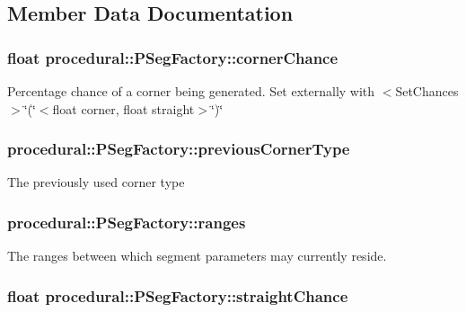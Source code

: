\subsection{Member Data Documentation}
\hypertarget{classprocedural_1_1_p_seg_factory_a02557cf9cc05ee759b23a95e45126dd4}{
\subsubsection[{corner\-Chance}]{\setlength{\rightskip}{0pt plus 5cm}float procedural\-::\-P\-Seg\-Factory\-::corner\-Chance\hspace{0.3cm}{\ttfamily [private]}}}\label{classprocedural_1_1_p_seg_factory_a02557cf9cc05ee759b23a95e45126dd4}
Percentage chance of a corner being generated. Set externally with $<$\-Set\-Chances$>$\char`\"{}(\char`\"{}$<$float corner, float straight$>$\char`\"{})\char`\"{} \hypertarget{classprocedural_1_1_p_seg_factory_afc00d8f9ae8554244639fb15db0f11d3}{
\subsubsection[{previous\-Corner\-Type}]{ procedural\-::\-P\-Seg\-Factory\-::previous\-Corner\-Type\hspace{0.3cm}{\ttfamily [private]}}}\label{classprocedural_1_1_p_seg_factory_afc00d8f9ae8554244639fb15db0f11d3}
The previously used corner type \hypertarget{classprocedural_1_1_p_seg_factory_a34fbc09f9aca697f61dbc8a7d1d8a2cd}{
\subsubsection[{ranges}]{ procedural\-::\-P\-Seg\-Factory\-::ranges}}\label{classprocedural_1_1_p_seg_factory_a34fbc09f9aca697f61dbc8a7d1d8a2cd}
The ranges between which segment parameters may currently reside. \hypertarget{classprocedural_1_1_p_seg_factory_a6cc50e9c858c733ced48b220cc75fbed}{
\subsubsection[{straight\-Chance}]{\setlength{\rightskip}{0pt plus 5cm}float procedural\-::\-P\-Seg\-Factory\-::straight\-Chance\hspace{0.3cm}{\ttfamily [private]}}}\label{classprocedural_1_1_p_seg_factory_a6cc50e9c858c733ced48b220cc75fbed}
